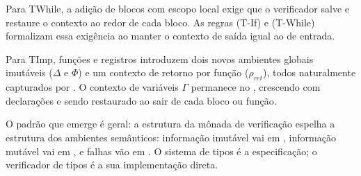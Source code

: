 Para TWhile, a adição de blocos com escopo local exige que o
verificador salve e restaure o contexto ao redor de cada bloco. As
regras (T-If) e (T-While) formalizam essa exigência ao manter o
contexto de saída igual ao de entrada.

Para TImp, funções e registros introduzem dois novos ambientes
globais imutáveis (\(\Delta\) e \(\Phi\)) e um contexto de retorno
por função (\(\rho_{\mathit{ret}}\)), todos naturalmente capturados
por . O contexto de variáveis \(\Gamma\)
permanece no , crescendo com declarações e sendo
restaurado ao sair de cada bloco ou função.

O padrão que emerge é geral: a estrutura da mônada de verificação
espelha a estrutura dos ambientes semânticos: informação imutável
vai em , informação mutável vai em
, e falhas vão em . O sistema de
tipos é a especificação; o verificador de tipos é a sua implementação
direta.
